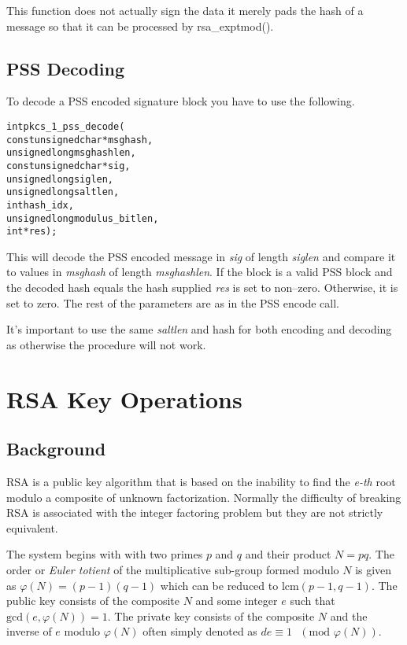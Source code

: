 \documentclass[synpaper]{book}
\def\phi{\varphi}
\newcommand{\mysection}[1]    %
	{                   %
	\section{#1}
   \markboth{\textsf{www.libtom.net}}{\thesection ~ {#1}}
	}
\begin{document}
This function does not actually sign the data it merely pads the hash of a message so that it can be processed by rsa\_exptmod().

\subsection{PSS Decoding}

To decode a PSS encoded signature block you have to use the following.

\begin{alltt}
int pkcs_1_pss_decode(
    const unsigned char *msghash,
          unsigned long  msghashlen,
    const unsigned char *sig,
          unsigned long  siglen,
          unsigned long  saltlen,
                    int  hash_idx,
          unsigned long  modulus_bitlen,
                    int *res);
\end{alltt}
This will decode the PSS encoded message in \textit{sig} of length \textit{siglen} and compare it to values in \textit{msghash} of length
\textit{msghashlen}.  If the block is a valid PSS block and the decoded hash equals the hash supplied \textit{res} is set to non--zero.  Otherwise,
it is set to zero.  The rest of the parameters are as in the PSS encode call.

It's important to use the same \textit{saltlen} and hash for both encoding and decoding as otherwise the procedure will not work.

\mysection{RSA Key Operations}
\subsection{Background}

RSA is a public key algorithm that is based on the inability to find the \textit{e-th} root modulo a composite of unknown
factorization.  Normally the difficulty of breaking RSA is associated with the integer factoring problem but they are
not strictly equivalent.

The system begins with with two primes $p$ and $q$ and their product $N = pq$.  The order or \textit{Euler totient} of the
multiplicative sub-group formed modulo $N$ is given as $\phi(N) = (p - 1)(q - 1)$ which can be reduced to
$\mbox{lcm}(p - 1, q - 1)$.  The public key consists of the composite $N$ and some integer $e$ such that
$\mbox{gcd}(e, \phi(N)) = 1$.  The private key consists of the composite $N$ and the inverse of $e$ modulo $\phi(N)$
often simply denoted as $de \equiv 1\mbox{ }(\mbox{mod }\phi(N))$.
\end{document}
